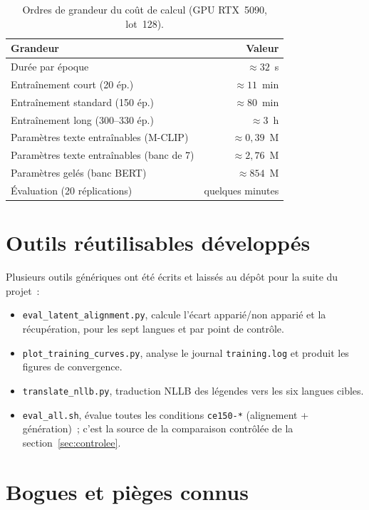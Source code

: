 \documentclass[12pt,a4paper,oneside]{report}
\theoremstyle{definition}
\theoremstyle{plain}
\begin{document}
\begin{table}[ht]
\centering
\caption{Ordres de grandeur du coût de calcul (GPU RTX~5090, lot~128).}
\label{tab:cout}
\small
\begin{tabular}{@{}lr@{}}
\toprule
Grandeur & Valeur \\
\midrule
Durée par époque & $\approx 32$~s \\
Entraînement court (20 ép.) & $\approx 11$~min \\
Entraînement standard (150 ép.) & $\approx 80$~min \\
Entraînement long (300--330 ép.) & $\approx 3$~h \\
Paramètres texte entraînables (M-CLIP) & $\approx 0{,}39$~M \\
Paramètres texte entraînables (banc de 7) & $\approx 2{,}76$~M \\
Paramètres gelés (banc BERT) & $\approx 854$~M \\
Évaluation (20 réplications) & quelques minutes \\
\bottomrule
\end{tabular}
\end{table}

\section{Outils réutilisables développés}
\label{sec:outils}

Plusieurs outils génériques ont été écrits et laissés au dépôt pour la suite du
projet~:

\begin{itemize}[leftmargin=*]
\item \texttt{eval\_latent\_alignment.py}, calcule l'écart apparié/non apparié
et la récupération, pour les sept langues et par point de contrôle.
\item \texttt{plot\_training\_curves.py}, analyse le journal
\texttt{training.log} et produit les figures de convergence.
\item \texttt{translate\_nllb.py}, traduction NLLB des légendes vers les six
langues cibles.
\item \texttt{eval\_all.sh}, évalue toutes les conditions \texttt{ce150-*}
(alignement + génération)~; c'est la source de la comparaison contrôlée de la
section~\ref{sec:controlee}.
\end{itemize}

\section{Bogues et pièges connus}
\label{sec:bugs}
\end{document}
